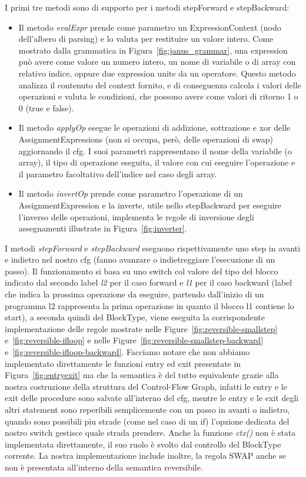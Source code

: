 \documentclass{article}
\theoremstyle{plain}
\theoremstyle{definition}
\theoremstyle{plain}
\begin{document}
I primi tre metodi sono di supporto per i metodi stepForward e stepBackward:
\begin{itemize}
\item Il metodo \emph{evalExpr} prende come parametro un ExpressionContext (nodo dell'albero di parsing) e lo valuta per restituire un valore intero. Come mostrato dalla grammatica in Figura~\ref{fig:janus_grammar}, una expression può avere come valore un numero intero, un nome di variabile o di array con relativo indice, oppure due expression unite da un operatore. Questo metodo analizza il contenuto del context fornito, e di conseguenza calcola i valori delle operazioni e valuta le condizioni, che possono avere come valori di ritorno 1 o 0 (true e false).
\item Il metodo \emph{applyOp} esegue le operazioni di addizione, sottrazione e xor delle AssignmentExpressions (non si occupa, però, delle operazioni di swap) aggiornando il cfg. I suoi parametri rappresentano il nome della variabile (o array), il tipo di operazione eseguita, il valore con cui eseguire l'operazione e il parametro facoltativo dell'indice nel caso degli array.
\item Il metodo \emph{invertOp} prende come parametro l'operazione di un AssignmentExpression e la inverte, utile nello stepBackward per eseguire l'inverso delle operazioni, implementa le regole di inversione degli assegnamenti illustrate in Figura~\ref{fig:inverter}.
\end{itemize}

I metodi \emph{stepForward} e \emph{stepBackward} eseguono rispettivamente uno step in avanti e indietro nel nostro cfg (fanno avanzare o indietreggiare l'esecuzione di un passo). Il funzionamento si basa su uno switch col valore del tipo del blocco indicato dal secondo label \emph{l2} per il caso forward e \emph{l1} per il caso backward (label che indica la prossima operazione da eseguire, partendo dall'inizio di un programma l2 rappresenta la prima operazione in quanto il blocco l1 contiene lo start), a seconda quindi del BlockType, viene eseguita la corrispondente implementazione delle regole mostrate nelle Figure~\ref{fig:reversible-smallstep} e~\ref{fig:reversible-ifloop} e nelle Figure~\ref{fig:reversible-smallstep-backward} e~\ref{fig:reversible-ifloop-backward}. Facciamo notare che non abbiamo implementato direttamente le funzioni entry ed exit presentate in Figura~\ref{fig:entryexit} ma che la semantica è del tutto equivalente grazie alla nostra costruzione della struttura del Control-Flow Graph, infatti le entry e le exit delle procedure sono salvate all'interno del cfg, mentre le entry e le exit degli altri statement sono reperibili semplicemente con un passo in avanti o indietro, quando sono possibili piu strade (come nel caso di un if) l'opzione dedicata del nostro switch gestisce quale strada prendere. Anche la funzione \emph{ctx()} non è stata implementata direttamente, il suo ruolo è svolto dal controllo del BlockType corrente. La nostra implementazione include inoltre, la regola SWAP anche se non è presentata all'interno della semantica reversibile.\smallskip
\end{document}
